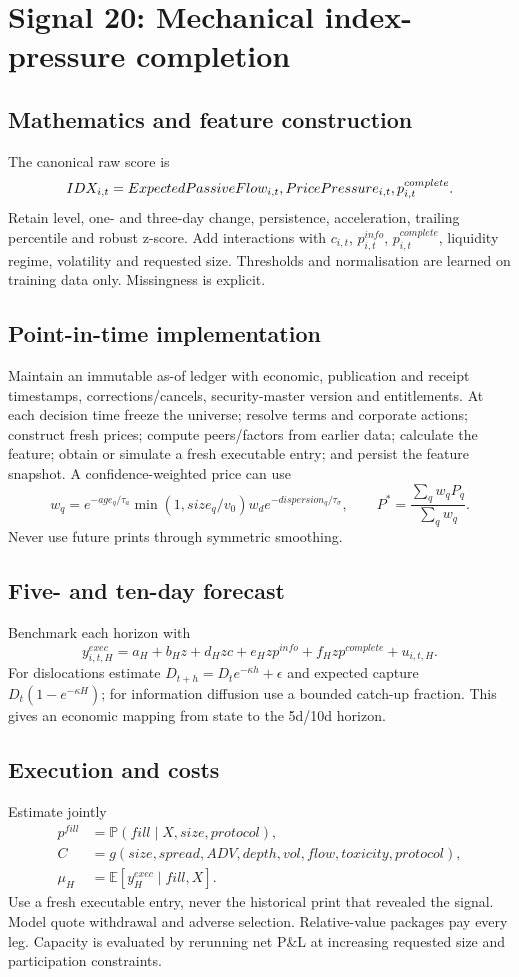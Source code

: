 \documentclass[10pt]{article}
\newcommand{\E}{\mathbb{E}}\newcommand{\Pp}{\mathbb{P}}
\begin{document}
\section{Signal 20: Mechanical index-pressure completion}
\subsection{Mathematics and feature construction}
The canonical raw score is
\begin{equation}IDX_{i,t}=ExpectedPassiveFlow_{i,t}\\,PricePressure_{i,t}\\,p^{complete}_{i,t}.\end{equation}
Retain level, one- and three-day change, persistence, acceleration, trailing percentile and robust z-score. Add interactions with $c_{i,t}$, $p^{info}_{i,t}$, $p^{complete}_{i,t}$, liquidity regime, volatility and requested size. Thresholds and normalisation are learned on training data only. Missingness is explicit.

\subsection{Point-in-time implementation}
Maintain an immutable as-of ledger with economic, publication and receipt timestamps, corrections/cancels, security-master version and entitlements. At each decision time freeze the universe; resolve terms and corporate actions; construct fresh prices; compute peers/factors from earlier data; calculate the feature; obtain or simulate a fresh executable entry; and persist the feature snapshot. A confidence-weighted price can use
\[w_q=e^{-age_q/\tau_a}\min(1,size_q/v_0)w_d e^{-dispersion_q/\tau_\sigma},\qquad P^*=\frac{\sum_qw_qP_q}{\sum_qw_q}.\]
Never use future prints through symmetric smoothing.

\subsection{Five- and ten-day forecast}
Benchmark each horizon with
\[y^{exec}_{i,t,H}=a_H+b_Hz+d_Hzc+e_Hzp^{info}+f_Hzp^{complete}+u_{i,t,H}.\]
For dislocations estimate $D_{t+h}=D_te^{-\kappa h}+\epsilon$ and expected capture $D_t(1-e^{-\kappa H})$; for information diffusion use a bounded catch-up fraction. This gives an economic mapping from state to the 5d/10d horizon.

\subsection{Execution and costs}
Estimate jointly
\begin{align}
p^{fill}&=\Pp(fill\mid X,size,protocol),\\
C&=g(size,spread,ADV,depth,vol,flow,toxicity,protocol),\\
\mu_H&=\E[y^{exec}_H\mid fill,X].
\end{align}
Use a fresh executable entry, never the historical print that revealed the signal. Model quote withdrawal and adverse selection. Relative-value packages pay every leg. Capacity is evaluated by rerunning net P\&L at increasing requested size and participation constraints.
\end{document}
